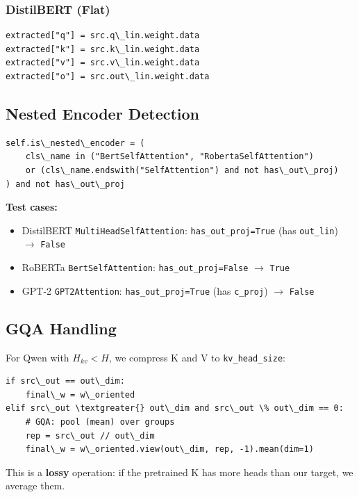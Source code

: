 \subsubsection{DistilBERT (Flat)}

\begin{lstlisting}
extracted["q"] = src.q\_lin.weight.data
extracted["k"] = src.k\_lin.weight.data
extracted["v"] = src.v\_lin.weight.data
extracted["o"] = src.out\_lin.weight.data
\end{lstlisting}

\subsection{Nested Encoder Detection}

\begin{lstlisting}
self.is\_nested\_encoder = (
    cls\_name in ("BertSelfAttention", "RobertaSelfAttention")
    or (cls\_name.endswith("SelfAttention") and not has\_out\_proj)
) and not has\_out\_proj
\end{lstlisting}

\textbf{Test cases:}
\begin{itemize}
\item DistilBERT \texttt{MultiHeadSelfAttention}: \texttt{has\_out\_proj=True} (has \texttt{out\_lin}) $\to$ \texttt{False}
\item RoBERTa \texttt{BertSelfAttention}: \texttt{has\_out\_proj=False} $\to$ \texttt{True}
\item GPT-2 \texttt{GPT2Attention}: \texttt{has\_out\_proj=True} (has \texttt{c\_proj}) $\to$ \texttt{False}

\end{itemize}
\subsection{GQA Handling}

For Qwen with $H_{kv} < H$, we compress K and V to \texttt{kv\_head\_size}:

\begin{lstlisting}
if src\_out == out\_dim:
    final\_w = w\_oriented
elif src\_out \textgreater{} out\_dim and src\_out \% out\_dim == 0:
    # GQA: pool (mean) over groups
    rep = src\_out // out\_dim
    final\_w = w\_oriented.view(out\_dim, rep, -1).mean(dim=1)
\end{lstlisting}

This is a \textbf{lossy} operation: if the pretrained K has more heads than our 
target, we average them.

